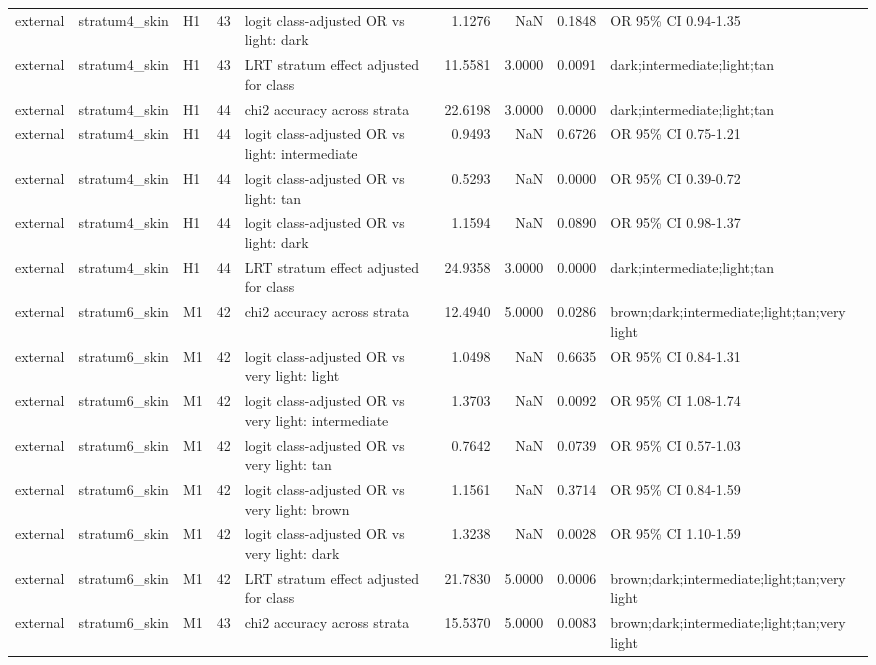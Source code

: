 \begin{tabular}{lllrlrrrl}
external & stratum4\_skin & H1 & 43 & logit class-adjusted OR vs light: dark & 1.1276 & NaN & 0.1848 & OR 95\% CI 0.94-1.35 \\
external & stratum4\_skin & H1 & 43 & LRT stratum effect adjusted for class & 11.5581 & 3.0000 & 0.0091 & dark;intermediate;light;tan \\
external & stratum4\_skin & H1 & 44 & chi2 accuracy across strata & 22.6198 & 3.0000 & 0.0000 & dark;intermediate;light;tan \\
external & stratum4\_skin & H1 & 44 & logit class-adjusted OR vs light: intermediate & 0.9493 & NaN & 0.6726 & OR 95\% CI 0.75-1.21 \\
external & stratum4\_skin & H1 & 44 & logit class-adjusted OR vs light: tan & 0.5293 & NaN & 0.0000 & OR 95\% CI 0.39-0.72 \\
external & stratum4\_skin & H1 & 44 & logit class-adjusted OR vs light: dark & 1.1594 & NaN & 0.0890 & OR 95\% CI 0.98-1.37 \\
external & stratum4\_skin & H1 & 44 & LRT stratum effect adjusted for class & 24.9358 & 3.0000 & 0.0000 & dark;intermediate;light;tan \\
external & stratum6\_skin & M1 & 42 & chi2 accuracy across strata & 12.4940 & 5.0000 & 0.0286 & brown;dark;intermediate;light;tan;very light \\
external & stratum6\_skin & M1 & 42 & logit class-adjusted OR vs very light: light & 1.0498 & NaN & 0.6635 & OR 95\% CI 0.84-1.31 \\
external & stratum6\_skin & M1 & 42 & logit class-adjusted OR vs very light: intermediate & 1.3703 & NaN & 0.0092 & OR 95\% CI 1.08-1.74 \\
external & stratum6\_skin & M1 & 42 & logit class-adjusted OR vs very light: tan & 0.7642 & NaN & 0.0739 & OR 95\% CI 0.57-1.03 \\
external & stratum6\_skin & M1 & 42 & logit class-adjusted OR vs very light: brown & 1.1561 & NaN & 0.3714 & OR 95\% CI 0.84-1.59 \\
external & stratum6\_skin & M1 & 42 & logit class-adjusted OR vs very light: dark & 1.3238 & NaN & 0.0028 & OR 95\% CI 1.10-1.59 \\
external & stratum6\_skin & M1 & 42 & LRT stratum effect adjusted for class & 21.7830 & 5.0000 & 0.0006 & brown;dark;intermediate;light;tan;very light \\
external & stratum6\_skin & M1 & 43 & chi2 accuracy across strata & 15.5370 & 5.0000 & 0.0083 & brown;dark;intermediate;light;tan;very light \\

\end{tabular}
